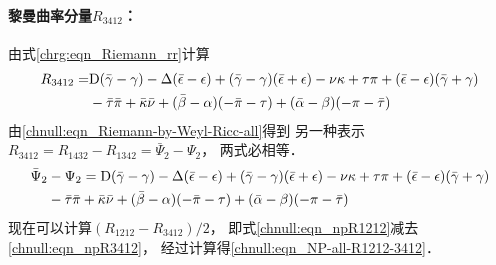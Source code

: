 \paragraph{黎曼曲率分量$R_{3412}$：}
由式\eqref{chrg:eqn_Riemann_rr}计算
\begin{align*}
    R_{3412}
    =& {\rm D} (\bar{\gamma}-\gamma) -\Delta (\bar{\epsilon}-\epsilon)
    + (\bar{\gamma}-\gamma) (\bar{\epsilon}+\epsilon)
    - \nu \kappa  + \tau\pi
    +  (\bar{\epsilon}-\epsilon) (\bar{\gamma}+\gamma)\\
    &- \bar{\tau} \bar{\pi} + \bar{\kappa} \bar{\nu}
    +  (\bar{\beta}-\alpha) (-\bar{\pi} -\tau  )
    +  (\bar{\alpha}-\beta) (-\pi -\bar{\tau}  )
\end{align*}
由\eqref{chnull:eqn_Riemann-by-Weyl-Ricc-all}得到
另一种表示$R_{3412}=R_{1432}-R_{1342}=\bar{\Psi}_{2} - \Psi_2 $，
两式必相等．
\begin{align}
        \bar{\Psi}_{2} &- \Psi_2  =
        {\rm D} (\bar{\gamma}-\gamma) -\Delta (\bar{\epsilon}-\epsilon)
        + (\bar{\gamma}-\gamma) (\bar{\epsilon}+\epsilon)
        - \nu \kappa  + \tau\pi
        +  (\bar{\epsilon}-\epsilon) (\bar{\gamma}+\gamma) \notag \\
        &- \bar{\tau} \bar{\pi} + \bar{\kappa} \bar{\nu}
        +  (\bar{\beta}-\alpha) (-\bar{\pi} -\tau  )
        +  (\bar{\alpha}-\beta) (-\pi -\bar{\tau}  ) \label{chnull:eqn_npR3412}
    \end{align}
现在可以计算$(R_{1212}-R_{3412})/2$，
即式\eqref{chnull:eqn_npR1212}减去\eqref{chnull:eqn_npR3412}，
经过计算得\eqref{chnull:eqn_NP-all-R1212-3412}．

